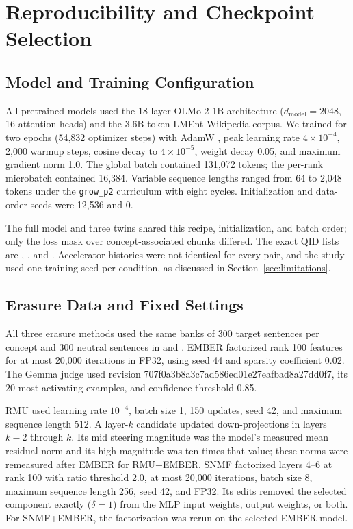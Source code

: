 \section{Reproducibility and Checkpoint Selection}
\label{app:checkpoint-selection}

\subsection{Model and Training Configuration}

All pretrained models used the 18-layer OLMo-2 1B architecture ($d_{\mathrm{model}}=
2048$, 16 attention heads) and the 3.6B-token LMEnt Wikipedia corpus. We
trained for two epochs (54,832 optimizer steps) with AdamW
\citep{loshchilov2019decoupled}, peak learning rate
$4\times10^{-4}$, 2,000 warmup steps, cosine decay to $4\times10^{-5}$,
weight decay 0.05, and maximum gradient norm 1.0. The global batch contained
131,072 tokens; the per-rank microbatch contained 16,384. Variable sequence
lengths ranged from 64 to 2,048 tokens under the \texttt{grow\_p2} curriculum
with eight cycles. Initialization and data-order seeds were 12,536 and 0.

The full model and three twins shared this recipe, initialization, and batch
order; only the loss mask over concept-associated chunks differed. The exact
QID lists are ,
, and
. Accelerator histories were not
identical for every pair, and the study used one training seed per condition,
as discussed in Section~\ref{sec:limitations}.

\subsection{Erasure Data and Fixed Settings}

All three erasure methods used the same banks of 300 target sentences per
concept and 300 neutral sentences in
 and
. EMBER factorized rank 100
features for at most 20,000 iterations in FP32, using seed 44 and sparsity
coefficient 0.02. The Gemma judge used revision
{\scriptsize\ttfamily 707f0a3b8a3c7ad586ed01e27eafbad8a27dd0f7}, its 20 most activating
examples, and confidence threshold 0.85.

RMU used learning rate $10^{-4}$, batch size 1, 150 updates, seed 42, and
maximum sequence length 512. A layer-$k$ candidate updated down-projections in
layers $k-2$ through $k$. Its mid steering magnitude was the model's measured
mean residual norm and its high magnitude was ten times that value; these
norms were remeasured after EMBER for RMU+EMBER. SNMF factorized layers 4--6
at rank 100 with ratio threshold 2.0, at most 20,000 iterations, batch size 8,
maximum sequence length 256, seed 42, and FP32. Its edits removed the selected
component exactly ($\delta=1$) from the MLP input weights, output weights, or
both. For SNMF+EMBER, the factorization was rerun on the selected EMBER model.

